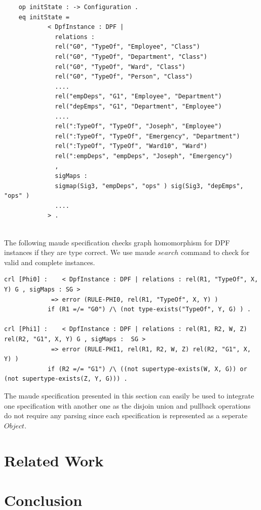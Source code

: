\documentclass{eceasst}
\begin{document}
\tiny
\begin{verbatim}
	op initState : -> Configuration .
	eq initState = 
			< DpfInstance : DPF | 
			  relations : 
			  rel("G0", "TypeOf", "Employee", "Class")
			  rel("G0", "TypeOf", "Department", "Class")
			  rel("G0", "TypeOf", "Ward", "Class")
			  rel("G0", "TypeOf", "Person", "Class")
			  ....
			  rel("empDeps", "G1", "Employee", "Department")
			  rel("depEmps", "G1", "Department", "Employee")
			  ....			  
			  rel(":TypeOf", "TypeOf", "Joseph", "Employee") 
			  rel(":TypeOf", "TypeOf", "Emergency", "Department") 
			  rel(":TypeOf", "TypeOf", "Ward10", "Ward") 			  
			  rel(":empDeps", "empDeps", "Joseph", "Emergency") 			  
			  ,
			  sigMaps : 
			  sigmap(Sig3, "empDeps", "ops" ) sig(Sig3, "depEmps", "ops" )
			  ....
			> .
 
\end{verbatim}
\normalsize

The following maude specification checks graph homomorphism for DPF instances if they are type correct. We use maude $search$ command to check for valid and complete instances. 


\tiny
\begin{verbatim}
crl [Phi0] :	< DpfInstance : DPF | relations : rel(R1, "TypeOf", X, Y) G , sigMaps : SG > 
			 => error (RULE-PHI0, rel(R1, "TypeOf", X, Y) )
			if (R1 =/= "G0") /\ (not type-exists("TypeOf", Y, G) ) .

crl [Phi1] :	< DpfInstance : DPF | relations : rel(R1, R2, W, Z) rel(R2, "G1", X, Y) G , sigMaps :  SG > 
			 => error (RULE-PHI1, rel(R1, R2, W, Z) rel(R2, "G1", X, Y) )
			if (R2 =/= "G1") /\ ((not supertype-exists(W, X, G)) or (not supertype-exists(Z, Y, G))) .
\end{verbatim}

\normalsize

The maude specification presented in this section can easily be used to integrate one specification with another one as the disjoin union and pullback operations do not require any parsing since 
each specification is represented as a seperate $Object$. 

 
\section{Related Work}\label{lbl:relatedwork}



\section{Conclusion}\label{lbl:conclusion}
 


{}
\end{document}

